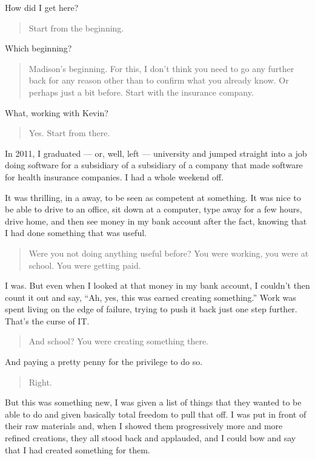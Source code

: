 How did I get here?

\begin{quote}
Start from the beginning.
\end{quote}

Which beginning?

\begin{quote}
Madison's beginning. For this, I don't think you need to go any further back for any reason other than to confirm what you already know. Or perhaps just a bit before. Start with the insurance company.
\end{quote}

What, working with Kevin?

\begin{quote}
Yes. Start from there.
\end{quote}

In 2011, I graduated --- or, well, left --- university and jumped straight into a job doing software for a subsidiary of a subsidiary of a company that made software for health insurance companies. I had a whole weekend off.

It was thrilling, in a away, to be seen as competent at something. It was nice to be able to drive to an office, sit down at a computer, type away for a few hours, drive home, and then see money in my bank account after the fact, knowing that I had done something that was useful.

\begin{quote}
Were you not doing anything useful before? You were working, you were at school. You were getting paid.
\end{quote}

I was. But even when I looked at that money in my bank account, I couldn't then count it out and say, ``Ah, yes, this was earned creating something.'' Work was spent living on the edge of failure, trying to push it back just one step further. That's the curse of IT.

\begin{quote}
And school? You were creating something there.
\end{quote}

And paying a pretty penny for the privilege to do so.

\begin{quote}
Right.
\end{quote}

But this was something new, I was given a list of things that they wanted to be able to do and given basically total freedom to pull that off. I was put in front of their raw materials and, when I showed them progressively more and more refined creations, they all stood back and applauded, and I could bow and say that I had created something for them.

